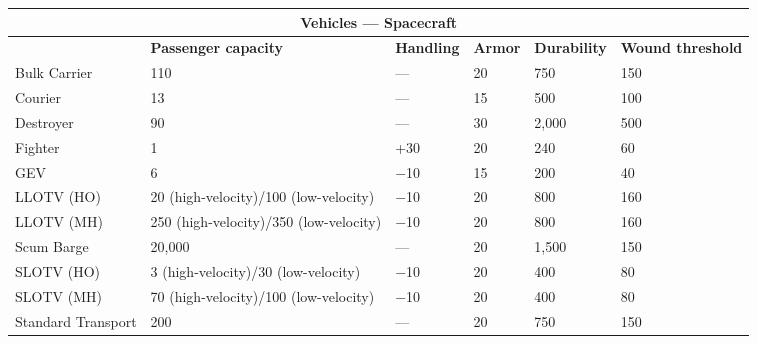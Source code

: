 \begin{table} \begin{tabularx}{\textwidth}{|l|X|l|X|l|l|} \hline

\multicolumn{6}{|c|}{\textbf{Vehicles --- Spacecraft}} \\ \hline

&\textbf{Passenger capacity}	&\textbf{Handling}	&\textbf{Armor}	&\textbf{Durability}	&\textbf{Wound threshold}\\ \hline

Bulk Carrier	&110	&--- &20	&750	&150 \\ \hline

Courier	&13	&--- &15	&500	&100 \\ \hline

Destroyer	&90	&--- &30	&2,000	&500 \\ \hline

Fighter	&1	&+30	&20	&240	&60 \\ \hline

GEV	&6	&$-$10	&15	&200	&40 \\ \hline

LLOTV (HO)	&20	(high-velocity)/100 (low-velocity)	&$-$10	&20	&800	&160 \\ \hline

LLOTV (MH)	&250 (high-velocity)/350 (low-velocity)	&$-$10	&20	&800	&160 \\ \hline

Scum Barge	&20,000	&--- &20	&1,500	&150 \\ \hline

SLOTV (HO)	&3 (high-velocity)/30 (low-velocity)	&$-$10	&20	&400	&80 \\ \hline

SLOTV (MH)	&70	(high-velocity)/100 (low-velocity)	&$-$10	&20	&400	&80 \\ \hline

Standard Transport	&200	&--- &20	&750	&150 \\ \hline

\end{tabularx} \label{tab:spacecraft} \end{table} 




